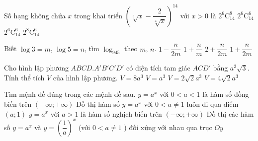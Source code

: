 \begin{ex}%
Số hạng không chứa $x$ trong khai triển ${\left(\sqrt[3]{x}-\dfrac{2}{\sqrt[4]{x}}\right)}^{14}$ với $x>0$ là
	\choice
	{$2^6\mathrm{C}_{14}^8$}
	{$2^6\mathrm{C}_{14}^6$}
	{$2^6\mathrm{C}_{14}^6$}
	{\True $2^8\mathrm{C}_{14}^6$}
\end{ex}
\begin{ex}%
Biết $\log 3=m$, $\log 5=n$, tìm $\log _945$ theo $m$, $n$.
\choice
	{$1-\dfrac{n}{2m}$}
	{$1+\dfrac{n}{m}$}
	{$2+\dfrac{n}{2m}$}
	{\True $1+\dfrac{n}{2m}$}
\end{ex}
\begin{ex}%
Cho hình lập phương $ABCD.A'B'C'D'$ có diện tích tam giác $ACD'$ bằng $a^2\sqrt{3}$. Tính thể tích $V$ của hình lập phương.
\choice
	{\True $V=8a^3$}
	{$V=a^3$}
	{$V=2\sqrt{2}a^3$}
	{$V=4\sqrt{2}a^3$}
\end{ex}
\begin{ex}%
Tìm mệnh đề đúng trong các mệnh đề sau.
\choice
	{$y=a^x$ với $0<a<1$ là hàm số đồng biến trên $\left(-\infty;+\infty \right)$}
	{Đồ thị hàm số $y=a^x$ với $0<a\ne 1$ luôn đi qua điểm $(a;1)$}
	{$y=a^x$ với $a>1$ là hàm số nghịch biến trên $\left(-\infty;+\infty \right)$}
	{\True Đồ thị các hàm số $y=a^x$ và $y={\left(\dfrac{1}{a}\right)}^x$ (với $0<a\ne 1$ ) đối xứng với nhau qua trục $Oy$}
\end{ex}

